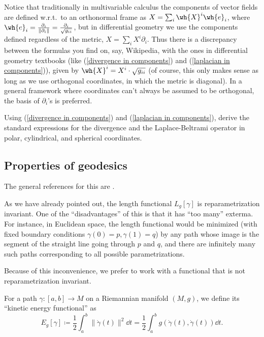 \begin{rem}
    Notice that traditionally in multivariable calculus the components of vector fields are defined w.r.t.\ to an orthonormal frame as $X=\sum_i \wh{X}^i \wh{e}_i$, where $\wh{e}_i=\frac{\partial_i}{\lVert \partial_i\lVert}=\frac{\partial_i}{\sqrt{g_{ii}}}$, but in differential geometry we use the components defined regardless of the metric, $X=\sum_i X^i \partial_i$. Thus there is a discrepancy between the formulas you find on, say, Wikipedia, with the ones in differential geometry textbooks (like (\ref{divergence in components}) and (\ref{laplacian in components})), given by $\wh{X}^i=X^i\cdot \sqrt{g_{ii}}$ (of course, this only makes sense as long as we use orthogonal coordinates, in which the metric is diagonal). In a general framework where coordinates can't always be assumed to be orthogonal, the basis of $\partial_i$'s is preferred.
\end{rem}

\begin{xca}
    Using (\ref{divergence in components}) and (\ref{laplacian in components}), derive the standard expressions for the divergence and the Laplace-Beltrami operator in polar, cylindrical, and spherical  coordinates. 
\end{xca}




\subsection{Properties of geodesics}


The general references for this \subsect are \cite{Jost,Milnor}.

As we have already pointed out, the length functional $L_g[\gamma]$ is reparametrization invariant. One of the ``disadvantages'' of this is that it has ``too many'' exterma. For instance, in Euclidean space, the length functional would be minimized (with fixed boundary conditions $\gamma(0)=p,\gamma(1)=q$) by any path whose image is the segment of the straight line going through $p$ and $q$, and there are infinitely many such paths corresponding to all possible parametrizations.

Because of this inconvenience, we prefer to work with a functional that is not reparametrization invariant.

\begin{defn}
    For a path $\gamma:[a,b]\to M$ on a Riemannian manifold $(M,g)$, we define its ``kinetic energy functional'' as
    \[E_g[\gamma]\coloneqq \frac12 \int_a^b \lVert \dot\gamma(t)\rVert^2\dd t=\frac12 \int_a^b g(\dot\gamma(t),\dot\gamma(t))\dd t.\]
\end{defn}

